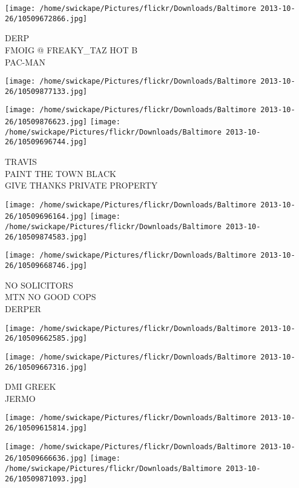 \documentclass[10pt,letterpaper]{article}
\begin{document}
\vspace{0.25in}
\texttt{[image: /home/swickape/Pictures/flickr/Downloads/Baltimore 2013-10-26/10509672866.jpg]}

DERP\\
FMOIG @ FREAKY\_TAZ HOT B\\
PAC{-}MAN\\
\pagebreak

\texttt{[image: /home/swickape/Pictures/flickr/Downloads/Baltimore 2013-10-26/10509877133.jpg]}

\vspace{0.25in}
\texttt{[image: /home/swickape/Pictures/flickr/Downloads/Baltimore 2013-10-26/10509876623.jpg]}
\texttt{[image: /home/swickape/Pictures/flickr/Downloads/Baltimore 2013-10-26/10509696744.jpg]}

TRAVIS\\
PAINT THE TOWN BLACK\\
GIVE THANKS PRIVATE PROPERTY\\
\pagebreak

\texttt{[image: /home/swickape/Pictures/flickr/Downloads/Baltimore 2013-10-26/10509696164.jpg]}
\texttt{[image: /home/swickape/Pictures/flickr/Downloads/Baltimore 2013-10-26/10509874583.jpg]}

\texttt{[image: /home/swickape/Pictures/flickr/Downloads/Baltimore 2013-10-26/10509668746.jpg]}

NO SOLICITORS\\
MTN NO GOOD COPS\\
DERPER\\
\pagebreak

\texttt{[image: /home/swickape/Pictures/flickr/Downloads/Baltimore 2013-10-26/10509662585.jpg]}

\vspace{0.25in}
\texttt{[image: /home/swickape/Pictures/flickr/Downloads/Baltimore 2013-10-26/10509667316.jpg]}

DMI GREEK\\
JERMO\\
\pagebreak

\texttt{[image: /home/swickape/Pictures/flickr/Downloads/Baltimore 2013-10-26/10509615814.jpg]}

\vspace{0.25in}
\texttt{[image: /home/swickape/Pictures/flickr/Downloads/Baltimore 2013-10-26/10509666636.jpg]}
\texttt{[image: /home/swickape/Pictures/flickr/Downloads/Baltimore 2013-10-26/10509871093.jpg]}
\end{document}
